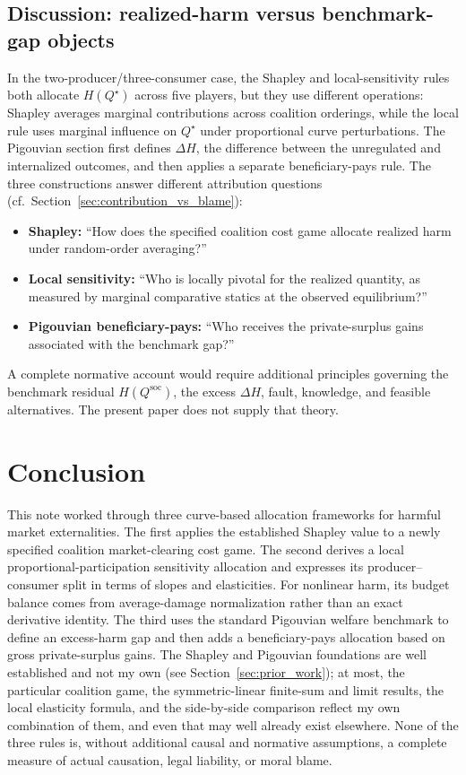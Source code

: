 \documentclass[journal, a4paper]{IEEEtran}
\begin{document}
\subsection{Discussion: realized-harm versus benchmark-gap objects}
In the two-producer/three-consumer case, the Shapley and local-sensitivity rules both allocate $H(Q^\star)$ across five players, but they use different operations: Shapley averages marginal contributions across coalition orderings, while the local rule uses marginal influence on $Q^\star$ under proportional curve perturbations. The Pigouvian section first defines $\Delta H$, the difference between the unregulated and internalized outcomes, and then applies a separate beneficiary-pays rule. The three constructions answer different attribution questions (cf.\ Section~\ref{sec:contribution_vs_blame}):
\begin{itemize}
\item \textbf{Shapley:} ``How does the specified coalition cost game allocate realized harm under random-order averaging?''
\item \textbf{Local sensitivity:} ``Who is locally pivotal for the realized quantity, as measured by marginal comparative statics at the observed equilibrium?''
\item \textbf{Pigouvian beneficiary-pays:} ``Who receives the private-surplus gains associated with the benchmark gap?''
\end{itemize}
A complete normative account would require additional principles governing the benchmark residual $H(Q^{\text{soc}})$, the excess $\Delta H$, fault, knowledge, and feasible alternatives. The present paper does not supply that theory.

\section{Conclusion}
This note worked through three curve-based allocation frameworks for harmful market externalities. The first applies the established Shapley value to a newly specified coalition market-clearing cost game. The second derives a local proportional-participation sensitivity allocation and expresses its producer--consumer split in terms of slopes and elasticities. For nonlinear harm, its budget balance comes from average-damage normalization rather than an exact derivative identity. The third uses the standard Pigouvian welfare benchmark to define an excess-harm gap and then adds a beneficiary-pays allocation based on gross private-surplus gains. The Shapley and Pigouvian foundations are well established and not my own (see Section~\ref{sec:prior_work}); at most, the particular coalition game, the symmetric-linear finite-sum and limit results, the local elasticity formula, and the side-by-side comparison reflect my own combination of them, and even that may well already exist elsewhere. None of the three rules is, without additional causal and normative assumptions, a complete measure of actual causation, legal liability, or moral blame.
\end{document}
